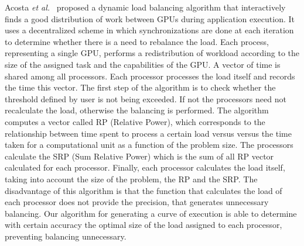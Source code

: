 \documentclass[journal]{IEEEtran}
\begin{document}
Acosta \emph{et al.}~\cite{acosta} proposed a dynamic load balancing algorithm
that interactively finds a good distribution of work between GPUs during
application execution. It uses a decentralized scheme in which synchronizations
are done at each iteration to determine whether there is a need to rebalance the
load. Each process, representing a single GPU, performs a redistribution of
workload according to the size of the assigned task and the capabilities of the
GPU. A vector of time is shared among all processors. Each processor processes the load itself and records the time this vector. The first step of the algorithm is to check whether the threshold defined by user is not being exceeded. If not the processors need not recalculate the load, otherwise the balancing is performed. The algorithm computes a vector called RP (Relative Power), which corresponds to the relationship between time spent to process a certain load versus versus the time taken for a computational unit as a function of the problem size. The processors calculate the SRP (Sum Relative Power) which is the sum of all RP vector calculated for each processor. Finally, each processor calculates the load itself, taking into account the size of the problem, the RP and the SRP. The disadvantage of this algorithm is that the function that calculates the load of each processor does not provide the precision, that generates unnecessary balancing. Our algorithm for generating a curve of execution is able to determine with certain accuracy the optimal size of the load assigned to each processor, preventing balancing unnecessary.
\end{document}
